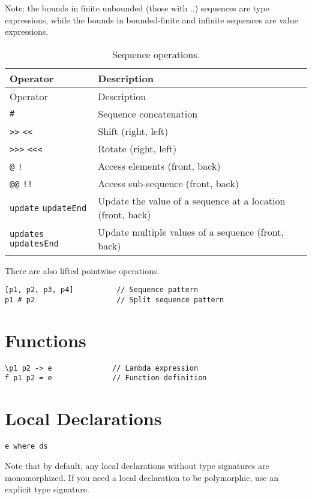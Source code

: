 Note: the bounds in finite unbounded (those with ..) sequences are type
expressions, while the bounds in bounded-finite and infinite sequences
are value expressions.

\begin{longtable}[c]{@{}ll@{}}
\caption{Sequence operations.}\tabularnewline
\toprule
Operator & Description\tabularnewline
\midrule
\endfirsthead
\toprule
Operator & Description\tabularnewline
\midrule
\endhead
\texttt{\#} & Sequence concatenation\tabularnewline
\texttt{\textgreater{}\textgreater{}} \texttt{\textless{}\textless{}} &
Shift (right, left)\tabularnewline
\texttt{\textgreater{}\textgreater{}\textgreater{}}
\texttt{\textless{}\textless{}\textless{}} & Rotate
(right, left)\tabularnewline
\texttt{@} \texttt{!} & Access elements (front, back)\tabularnewline
\texttt{@@} \texttt{!!} & Access sub-sequence
(front, back)\tabularnewline
\texttt{update} \texttt{updateEnd} & Update the value of a sequence at a location (front, back)\tabularnewline
\texttt{updates} \texttt{updatesEnd} & Update multiple values of a sequence (front, back)\tabularnewline
\bottomrule
\end{longtable}

There are also lifted pointwise operations.

\begin{verbatim}
[p1, p2, p3, p4]          // Sequence pattern
p1 # p2                   // Split sequence pattern
\end{verbatim}

\section{Functions}\label{functions}

\begin{verbatim}
\p1 p2 -> e              // Lambda expression
f p1 p2 = e              // Function definition
\end{verbatim}

\section{Local Declarations}\label{local-declarations}

\begin{verbatim}
e where ds
\end{verbatim}

Note that by default, any local declarations without type signatures are
monomorphized. If you need a local declaration to be polymorphic, use an
explicit type signature.

